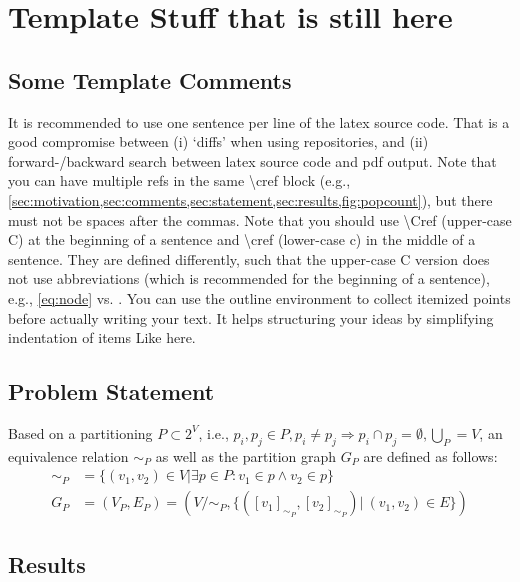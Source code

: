 \chapter{Template Stuff that is still here}

\section{Some Template Comments}
\label{sec:comments}

\begin{outline}
  \1 It is recommended to use one sentence per line of the latex source code.
  That is a good compromise between (i) `diffs' when using repositories, and (ii) forward-/backward search between latex source code and pdf output.
  \1 Note that you can have multiple refs in the same \textbackslash cref block (e.g., \cref{sec:motivation,sec:comments,sec:statement,sec:results,fig:popcount}), but there must not be spaces after the commas.
  \1 Note that you should use \textbackslash Cref (upper-case C) at the beginning of a sentence and \textbackslash cref (lower-case c) in the middle of a sentence.
  They are defined differently, such that the upper-case C version does not use abbreviations (which is recommended for the beginning of a sentence), e.g., \cref{eq:node} vs. .
  \1 You can use the outline environment to collect itemized points before actually writing your text.
    \2 It helps structuring your ideas by simplifying indentation of items
    \3 Like here.
\end{outline}


\section{Problem Statement}
\label{sec:statement}

Based on a partitioning $P \subset 2^V$, i.e., $p_i, p_j \in P, p_i \ne p_j \Rightarrow p_i \cap p_j = \emptyset, \bigcup\limits_P = V$, an equivalence relation $\sim_P$ as well as the partition graph $G_P$ are defined as follows:
\begin{align}
  \sim_P &= \{(v_1,v_2) \in V | \exists p \in P: v_1\in p \wedge v_2 \in p\}\\
  G_P &= (V_P, E_P) = (V/\sim_P, \{ ([v_1]_{\sim_P}, [v_2]_{\sim_P}) |\: (v_1,v_2) \in E \})
  \label{eq:node}
\end{align}



\section{Results}
\label{sec:results}

